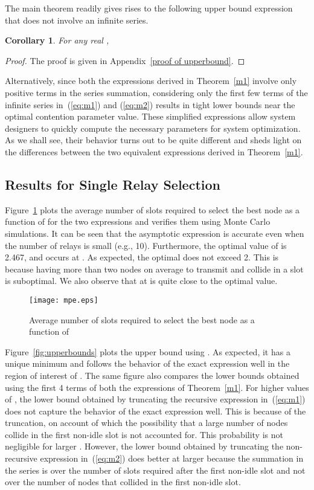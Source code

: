\documentclass[12pt,draftcls,peerreview, onecolumn]{IEEEtran}
\newtheorem{corollary}{{\bf Corollary}}
\newcommand{\eqn}[1]{(\ref{#1})}
\begin{document}
The main theorem readily gives rises to the following upper bound expression that does not involve an infinite series.  
\begin{corollary} \label{upperbound}
For any real ,


\end{corollary}
\begin{proof}
The proof is given in Appendix~\ref{proof of upperbound}.
\end{proof}


Alternatively, since both the expressions derived in Theorem~\ref{m1}
involve only positive terms in the series summation, considering only
the first few terms of the infinite series in~\eqn{eq:m1} and
\eqn{eq:m2} results in tight lower bounds near the optimal contention
parameter value.  These simplified expressions allow system designers
to quickly compute the necessary parameters for system optimization.
As we shall see, their behavior turns out to be quite different and
sheds light on the differences between the two equivalent expressions
derived in Theorem~\ref{m1}.


\subsection{Results for Single Relay Selection}

Figure~\ref{fig:m(p_e)} plots the average number of slots required to
select the best node as a function of  for the two expressions
and verifies them using Monte Carlo simulations.  It can be seen that
the asymptotic expression is accurate even when the number of relays
is small (e.g., 10). Furthermore, the optimal value of
 is 2.467, and occurs at . As
expected, the optimal  does not exceed 2. This is because having
more than two nodes on average to transmit and collide in a slot is
suboptimal. We also observe that  at  is quite close to the optimal value.
\begin{figure}[p]
        \centering
                \texttt{[image: mpe.eps]}
                \caption{Average number of slots required to select the best node  as a function of  }
        \label{fig:m(p_e)}
\end{figure}

Figure~\ref{fig:upperbounds} plots the upper bound using . As
expected, it has a unique minimum and follows the behavior of the
exact expression well in the region of interest of .  The same
figure also compares the lower bounds obtained using the first 4 terms
of both the expressions of Theorem~\ref{m1}.  For higher values of
, the lower bound obtained by truncating the recursive expression
in~\eqn{eq:m1} does not capture the behavior of the exact expression
well. This is because of the truncation, on account of which
the possibility that a large number of nodes collide in the first non-idle
slot is not accounted for. This probability is not negligible for
larger .  However, the lower bound obtained by truncating the
non-recursive expression in~\eqn{eq:m2} does better at larger 
because the summation in the series is over the number of slots
required after the first non-idle slot and not over the number of
nodes that collided in the first non-idle slot.
\end{document}
